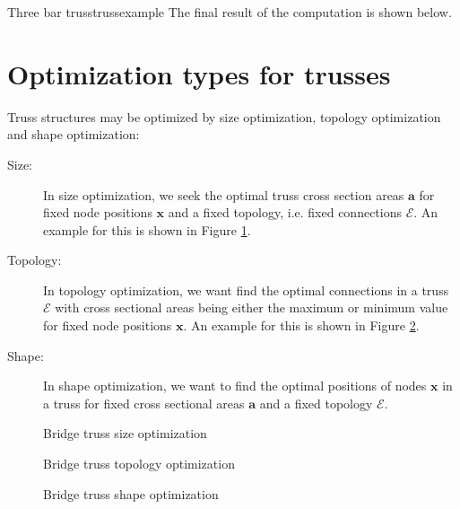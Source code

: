\begin{example}{Three bar truss}{trussexample}
    The final result of the computation is shown below.
    
    \begin{center}
        
    \end{center}    
\end{example}

\section{Optimization types for trusses}
Truss structures may be optimized by size optimization, topology optimization and shape optimization: 
\begin{description}
    \item[Size:]{In size optimization, we seek the optimal truss cross section areas $\mathbf{a}$ for fixed node positions $\mathbf{x}$ and a fixed topology, i.e. fixed connections $\mathcal{E}$. An example for this is shown in Figure \ref{fig:bridge_size}.} 
    \item[Topology:]{In topology optimization, we want find the optimal connections in a truss $\mathcal{E}$ with cross sectional areas being either the maximum or minimum value for fixed node positions $\mathbf{x}$. An example for this is shown in Figure \ref{fig:bridge_topology}.}
    \item[Shape:]{In shape optimization, we want to find the optimal positions of nodes $\mathbf{x}$ in a truss for fixed cross sectional areas $\mathbf{a}$ and a fixed topology $\mathcal{E}$.}
\end{description}

\begin{figure}[!ht]
    \centering
    
    \caption{Bridge truss size optimization}
    \label{fig:bridge_size}
\end{figure}

\begin{figure}[!ht]
    \centering
    
    \caption{Bridge truss topology optimization}
    \label{fig:bridge_topology}
\end{figure}

\begin{figure}[!ht]
    \centering
    
    \caption{Bridge truss shape optimization}
    \label{fig:bridge_shape}
\end{figure}





 